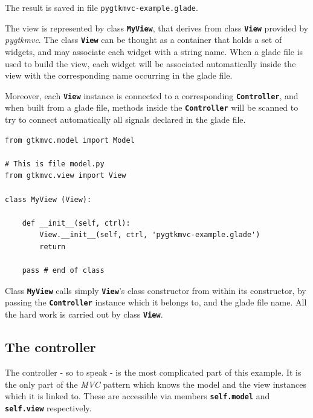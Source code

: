 \documentclass{article}
\newcommand{\kw}[1]{\emph{#1}\xspace}
\newcommand{\mvc}{\kw{MVC} pattern\xspace}
\newcommand{\pygtkmvc}{\kw{pygtkmvc}}
\newcommand{\file}[1]{\texttt{#1}\xspace}
\newcommand{\codename}[1]{\texttt{\bfseries \textcolor {codecolor}{#1}}\xspace}
\newcommand{\codesize}{\small \color{codecolor}}
\begin{document}
The result is saved in file \file{pygtkmvc-example.glade}.

The view is represented by class \codename{MyView}, that derives from
class \codename{View} provided by \pygtkmvc. The class \codename{View}
can be thought as a container that holds a set of widgets, and may
associate each widget with a string name. When a glade file is used to
build the view, each widget will be associated automatically inside
the view with the corresponding name occurring in the glade file.

Moreover, each \codename{View} instance is connected to a
corresponding \codename{Controller}, and when built from a glade file,
methods inside the \codename{Controller} will be scanned to try to
connect automatically all signals declared in the glade file.

{ \codesize 
\begin{verbatim}   
from gtkmvc.model import Model
  
# This is file model.py
from gtkmvc.view import View

class MyView (View):

    def __init__(self, ctrl):
        View.__init__(self, ctrl, 'pygtkmvc-example.glade')
        return

    pass # end of class
\end{verbatim}
} 

Class \codename{MyView} calls simply \codename{View}'s class
constructor from within its constructor, by passing the
\codename{Controller} instance which it belongs to, and the glade file
name. All the hard work is carried out by class \codename{View}.


\subsection{The controller}
The controller - so to speak - is the most complicated part of this
example. It is the only part of the \mvc which knows the model and the
view instances which it is linked to. These are accessible via members
\codename{self.model} and \codename{self.view} respectively.
  
\end{document}
